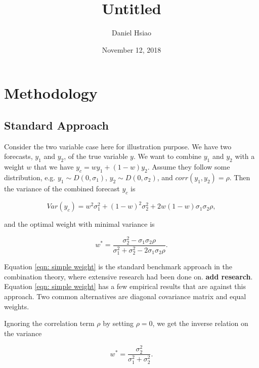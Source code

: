 \documentclass[]{article}
\title{Untitled}
\author{Daniel Hsiao}
\date{November 12, 2018}
\begin{document}
\maketitle

{
\setcounter{tocdepth}{3}
\tableofcontents
}
\newpage

\section{Methodology}\label{methodology}

\subsection{Standard Approach}\label{standard-approach}

Consider the two variable case here for illustration purpose. We have
two forecasts, \(y_1\) and \(y_2\), of the true variable \(y\). We want
to combine \(y_1\) and \(y_2\) with a weight \(w\) that we have
\(y_c = w y_1 + (1-w) y_2\). Assume they follow some distribution, e.g.
\(y_1 \sim D(0,\sigma_1)\), \(y_2 \sim D(0,\sigma_2)\), and
\(corr(y_1,y_2)=\rho\). Then the variance of the combined forecast
\(y_c\) is

\begin{equation}
\label{eqn: var yc}
Var(y_c) = w^2\sigma_1^2+ (1-w)^2\sigma_2^2+2w(1-w)\sigma_1\sigma_2\rho,
\end{equation}

and the optimal weight with minimal variance is

\begin{equation}
\label{eqn: simple weight}
w^*=\frac{\sigma_2^2-\sigma_1\sigma_2\rho}{\sigma_1^2+\sigma_2^2 -2\sigma_1\sigma_2\rho}.
\end{equation}

Equation \ref{eqn: simple weight} is the standard benchmark approach in
the combination theory, where extensive research had been done on.
\textbf{add research}. Equation \ref{eqn: simple weight} has a few
empirical results that are against this approach. Two common
alternatives are diagonal covariance matrix and equal weights.

Ignoring the correlation term \(\rho\) by setting \(\rho=0\), we get the
inverse relation on the variance

\begin{equation}
\label{eqn: simple weight no corr}
w^*=\frac{\sigma_2^2}{\sigma_1^2+\sigma_2^2}.
\end{equation}
\end{document}
